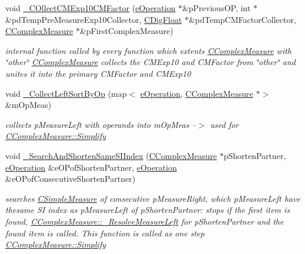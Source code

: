 \begin{DoxyCompactItemize}
void \hyperlink{classCComplexMeasure_aa87ac8d42bbb244fc77dae299ae35ca7}{\+\_\+\+C\+Ollect\+C\+M\+Exp10\+C\+M\+Factor} (\hyperlink{MeasureOperator_8h_a1431c79e3ad4b4c5bcc9f31f188538f2}{e\+Operation} $\ast$\&p\+Previous\+OP, int $\ast$\&pd\+Temp\+Pre\+Measure\+Exp10\+Collector, \hyperlink{classCDigFloat}{C\+Dig\+Float} $\ast$\&pd\+Temp\+C\+M\+Factor\+Collector, \hyperlink{classCComplexMeasure}{C\+Complex\+Measure} $\ast$\&p\+First\+Complex\+Measure)
\begin{DoxyCompactList}\small\item\em internal function called by every function which extents \hyperlink{classCComplexMeasure}{C\+Complex\+Measure} with \char`\"{}other\char`\"{} \hyperlink{classCComplexMeasure}{C\+Complex\+Measure} collects the C\+M\+Exp10 and C\+M\+Factor from \char`\"{}other\char`\"{} and unites it into the primary C\+M\+Factor and C\+M\+Exp10 \end{DoxyCompactList}\item 
void \hyperlink{classCComplexMeasure_ad2602b97f17c475a91454bf6bd1be1a4}{\+\_\+\+Collect\+Left\+Sort\+By\+Op} (map$<$ \hyperlink{MeasureOperator_8h_a1431c79e3ad4b4c5bcc9f31f188538f2}{e\+Operation}, \hyperlink{classCComplexMeasure}{C\+Complex\+Measure} $\ast$$>$ \&m\+Op\+Meas)
\begin{DoxyCompactList}\small\item\em collects p\+Measure\+Left with operands into m\+Op\+Meas --$>$ used for \hyperlink{classCComplexMeasure_addb4e69033f2c32fb3bf4a3aef5e1470}{C\+Complex\+Measure\+::\+Simplify} \end{DoxyCompactList}\item 
void \hyperlink{classCComplexMeasure_ac9bdfda3d2175532ba7e1f425e6b23b1}{\+\_\+\+Search\+And\+Shorten\+Same\+S\+I\+Index} (\hyperlink{classCComplexMeasure}{C\+Complex\+Measure} $\ast$p\+Shorten\+Partner, \hyperlink{MeasureOperator_8h_a1431c79e3ad4b4c5bcc9f31f188538f2}{e\+Operation} \&e\+O\+Pof\+Shorten\+Partner, \hyperlink{MeasureOperator_8h_a1431c79e3ad4b4c5bcc9f31f188538f2}{e\+Operation} \&e\+O\+Pof\+Consecutive\+Shorten\+Partner)
\begin{DoxyCompactList}\small\item\em searches \hyperlink{classCSimpleMeasure}{C\+Simple\+Measure} of consecutive p\+Measure\+Right, which p\+Measure\+Left have thesame SI index as p\+Measure\+Left of p\+Shorten\+Partner\+: stops if the first item is found, \hyperlink{classCComplexMeasure_a8f642a3a0044d4dc0492774bca8666e9}{C\+Complex\+Measure\+::\+\_\+\+Resolve\+Measure\+Left} for p\+Shorten\+Partner and the found item is called. This function is called as one step \hyperlink{classCComplexMeasure_addb4e69033f2c32fb3bf4a3aef5e1470}{C\+Complex\+Measure\+::\+Simplify} \end{DoxyCompactList}\item 
$$
\end{DoxyCompactItemize}
